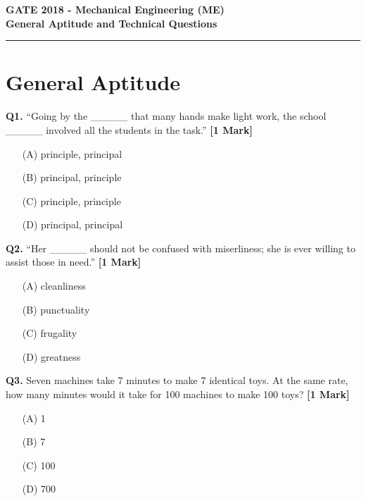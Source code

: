 \documentclass[11pt]{article}
\newcommand{\questiona}[2]{
    \noindent\textbf{Q#2.} #1 \hfill \textbf{[1 Mark]}
}
\begin{document}
\begin{center}
    \Large\textbf{GATE 2018 - Mechanical Engineering (ME)} \\
    \large\textbf{General Aptitude and Technical Questions} \\
    \rule{\textwidth}{0.5pt} %
\end{center}

\vspace{0.5cm}

\section*{General Aptitude}

\questiona{“Going by the \_\_\_\_\_ that many hands make light work, the school \_\_\_\_\_ involved all the students in the task.”}{1}
\begin{enumerate}
    \item[(A)] principle, principal
    \item[(B)] principal, principle
    \item[(C)] principle, principle
    \item[(D)] principal, principal
\end{enumerate}
\vspace{0.5cm}

\questiona{“Her \_\_\_\_\_ should not be confused with miserliness; she is ever willing to assist those in need.”}{2}
\begin{enumerate}
    \item[(A)] cleanliness
    \item[(B)] punctuality
    \item[(C)] frugality
    \item[(D)] greatness
\end{enumerate}
\vspace{0.5cm}

\questiona{Seven machines take 7 minutes to make 7 identical toys. At the same rate, how many minutes would it take for 100 machines to make 100 toys?}{3}
\begin{enumerate}
    \item[(A)] 1
    \item[(B)] 7
    \item[(C)] 100
    \item[(D)] 700
\end{enumerate}
\vspace{0.5cm}
\end{document}
